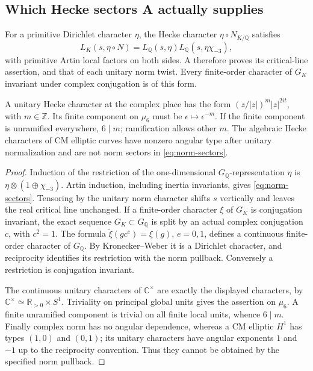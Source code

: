 \subsection{Which Hecke sectors A actually supplies}

\begin{proposition}
\label{AC-K05}
For a primitive Dirichlet character $\eta$, the Hecke character
$\eta\circ N_{K/\mathbb Q}$ satisfies
\begin{equation}
 L_K(s,\eta\circ N)=L_{\mathbb Q}(s,\eta)
                    L_{\mathbb Q}(s,\eta\chi_{-3}),             \label{eq:norm-sectors}
\end{equation}
with primitive Artin local factors on both sides. A therefore
proves its critical-line assertion, and that of each unitary
norm twist. Every finite-order character of $G_K$ invariant
under complex conjugation is of this form.

A unitary Hecke character at the complex place has the form
$(z/|z|)^m|z|^{2it}$, with $m\in\mathbb Z$. Its finite component
on $\mu_6$ must be $\epsilon\mapsto\epsilon^{-m}$.
If the finite component is unramified everywhere, $6\mid m$;
ramification allows other $m$. The algebraic Hecke characters
of CM elliptic curves have nonzero angular type after unitary
normalization and are not norm sectors in \eqref{eq:norm-sectors}.
\end{proposition}
\begin{proof}
Induction of the restriction of the one-dimensional
$G_{\mathbb Q}$-representation $\eta$ is
$\eta\otimes(1\oplus\chi_{-3})$. Artin induction, including
inertia invariants, gives \eqref{eq:norm-sectors}. Tensoring by
the unitary norm character shifts $s$ vertically and leaves
the real critical line unchanged. If a finite-order character
$\xi$ of $G_K$ is conjugation invariant, the exact sequence
$G_K\subset G_{\mathbb Q}$ is split by an actual complex
conjugation $c$, with $c^2=1$. The formula
$\widetilde\xi(gc^e)=\xi(g)$, $e=0,1$, defines a continuous
finite-order character of $G_{\mathbb Q}$. By Kronecker--Weber
it is a Dirichlet character, and reciprocity identifies its
restriction with the norm pullback. Conversely a restriction
is conjugation invariant.

The continuous unitary characters of $\mathbb C^\times$
are exactly the displayed characters, by
$\mathbb C^\times\simeq\mathbb R_{>0}\times S^1$.
Triviality on principal global units gives the assertion on
$\mu_6$. A finite unramified component is trivial on all
finite local units, whence $6\mid m$. Finally complex norm
has no angular dependence, whereas a CM elliptic $H^1$
has types $(1,0)$ and $(0,1)$; its unitary characters have
angular exponents $1$ and $-1$ up to the reciprocity convention.
Thus they cannot be obtained by the specified norm pullback.
\end{proof}

